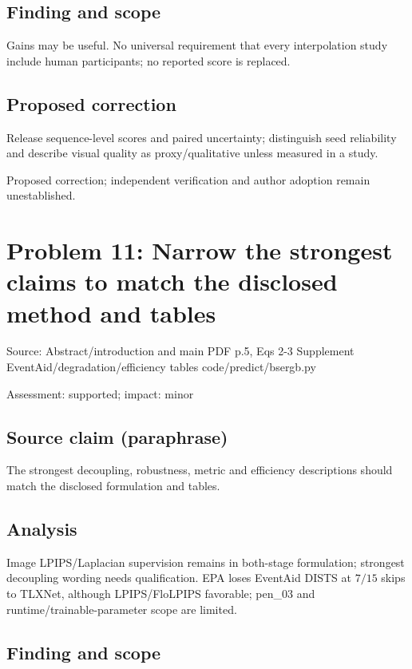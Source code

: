 \documentclass[11pt]{article}
\begin{document}
\subsection*{Finding and scope}

Gains may be useful. No universal requirement that every interpolation study include human participants; no reported score is replaced.

\subsection*{Proposed correction}

Release sequence-level scores and paired uncertainty; distinguish seed reliability and describe visual quality as proxy/qualitative unless measured in a study.

Proposed correction; independent verification and author adoption remain unestablished.

\section*{Problem 11: Narrow the strongest claims to match the disclosed method and tables}

Source: Abstract/introduction and main PDF p.5, Eqs 2-3 Supplement EventAid/degradation/efficiency tables code/predict/bsergb.py

Assessment: supported; impact: minor

\subsection*{Source claim (paraphrase)}

The strongest decoupling, robustness, metric and efficiency descriptions should match the disclosed formulation and tables.

\subsection*{Analysis}

Image LPIPS/Laplacian supervision remains in both-stage formulation; strongest decoupling wording needs qualification. EPA loses EventAid DISTS at \(7/15\) skips to TLXNet, although LPIPS/FloLPIPS favorable; pen\_03 and runtime/trainable-parameter scope are limited.

\subsection*{Finding and scope}
\end{document}
